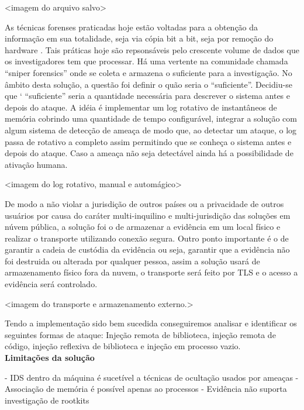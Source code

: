 \documentclass[
	12pt,				%
	openright,			%
	oneside,			%
	a4paper,			%
	english,			%
	french,				%
	spanish,			%
	brazil,				%
	]{abntex2}
\begin{document}
<imagem do arquivo salvo>

As técnicas forenses praticadas hoje estão voltadas para a obtenção da informação em sua totalidade, seja via cópia bit a bit, seja por remoção do hardware \cite{Simou2014}
\cite{Bem2008}. Tais práticas hoje são repsonsáveis pelo crescente volume de dados que os investigadores tem que processar. Há uma vertente na comunidade chamada ``sniper 
forensics'' onde se coleta e armazena o suficiente para a investigação. No âmbito desta solução, a questão foi definir o quão seria o ``suficiente''. Decidiu-se que `
``suficiente'' seria a quantidade necessária para descrever o sistema antes e depois do ataque. A idéia é implementar um log rotativo de instantâneos de memória cobrindo
uma quantidade de tempo configurável, integrar a solução com algum sistema de detecção de ameaça de modo que, ao detectar um ataque, o log passa de rotativo a completo assim
permitindo que se conheça o sistema antes e depois do ataque. Caso a ameaça não seja detectável ainda há a possibilidade de ativação humana.

<imagem do log rotativo, manual e automágico>

De modo a não violar a jurisdição de outros países ou a privacidade de outros usuários por causa do caráter multi-inquilino e multi-jurisdição das soluções em núvem pública,
a solução foi o de armazenar a evidência em um local físico e realizar o transporte utilizando conexão segura. Outro ponto importante é o de garantir a cadeia de custódia
da evidência ou seja, garantir que a evidência não foi destruida ou alterada por qualquer pessoa, assim a solução usará de armazenamento físico fora da nuvem, o transporte
será feito por TLS e o acesso a evidência será controlado.

<imagem do transporte e armazenamento externo.>

Tendo a implementação sido bem sucedida conseguiremos analisar e identificar os seguintes formas de ataque: Injeção remota de biblioteca, injeção remota de código, injeção
reflexiva de biblioteca e injeção em processo vazio.\\

\textbf{Limitações da solução}

	- IDS dentro da máquina é sucetível a técnicas de ocultação usados por ameaças
	- Associação de memória é possível apenas ao processos
	- Evidência não suporta investigação de rootkits

\end{document}
